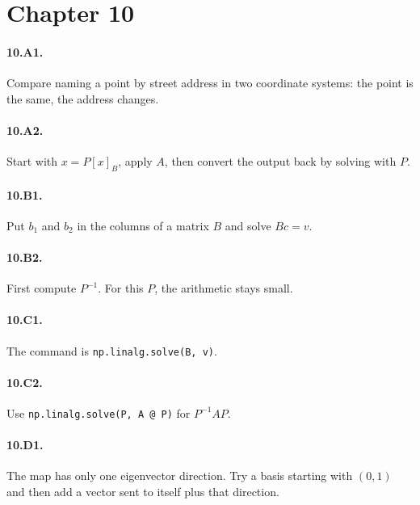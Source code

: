 \section*{Chapter 10}
\paragraph{10.A1.} Compare naming a point by street address in two coordinate
systems: the point is the same, the address changes.
\paragraph{10.A2.} Start with $x=P[x]_B$, apply $A$, then convert the output
back by solving with $P$.
\paragraph{10.B1.} Put $b_1$ and $b_2$ in the columns of a matrix $B$ and
solve $Bc=v$.
\paragraph{10.B2.} First compute $P^{-1}$. For this $P$, the arithmetic stays
small.
\paragraph{10.C1.} The command is \texttt{np.linalg.solve(B, v)}.
\paragraph{10.C2.} Use \texttt{np.linalg.solve(P, A @ P)} for $P^{-1}AP$.
\paragraph{10.D1.} The map has only one eigenvector direction. Try a basis
starting with $(0,1)$ and then add a vector sent to itself plus that direction.
